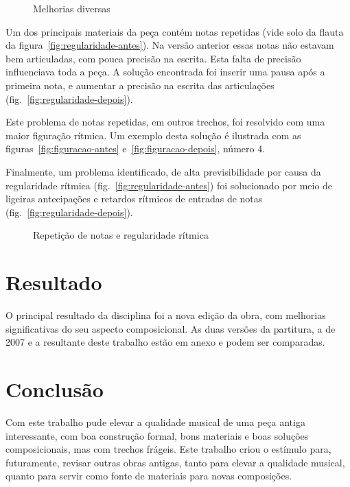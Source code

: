 \documentclass[10pt]{article}
\begin{document}
\begin{figure*}
  \centering

  \caption{Melhorias diversas}
  \label{fig:figuracao}
\end{figure*}

Um dos principais materiais da peça contém notas repetidas (vide solo
da flauta da figura~\ref{fig:regularidade-antes}). Na versão anterior
essas notas não estavam bem articuladas, com pouca precisão na
escrita. Esta falta de precisão influenciava toda a peça. A solução
encontrada foi inserir uma pausa após a primeira nota, e aumentar a
precisão na escrita das articulações
(fig.~\ref{fig:regularidade-depois}).

Este problema de notas repetidas, em outros trechos, foi resolvido com
uma maior figuração rítmica. Um exemplo desta solução é ilustrada com
as figuras~\ref{fig:figuracao-antes} e~\ref{fig:figuracao-depois},
número 4.

Finalmente, um problema identificado, de alta previsibilidade por
causa da regularidade rítmica (fig.~\ref{fig:regularidade-antes}) foi
solucionado por meio de ligeiras antecipações e retardos rítmicos de
entradas de notas (fig.~\ref{fig:regularidade-depois}).

\begin{figure*}
  \centering

  \caption{Repetição de notas e regularidade rítmica}
  \label{fig:regularidade}
\end{figure*}

\section{Resultado}
\label{sec:resultado}

O principal resultado da disciplina foi a nova edição da obra, com
melhorias significativas do seu aspecto composicional. As duas versões
da partitura, a de 2007 e a resultante deste trabalho estão em anexo e
podem ser comparadas.

\section{Conclusão}
\label{sec:conclusao}

Com este trabalho pude elevar a qualidade musical de uma peça antiga
interessante, com boa construção formal, bons materiais e boas
soluções composicionais, mas com trechos frágeis. Este trabalho criou
o estímulo para, futuramente, revisar outras obras antigas, tanto para
elevar a qualidade musical, quanto para servir como fonte de materiais
para novas composições.
\end{document}
